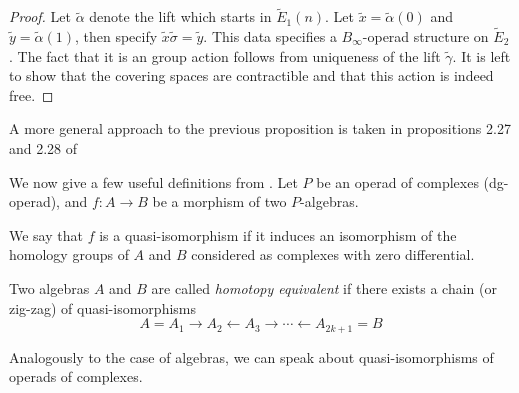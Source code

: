 \documentclass[TFM.tex]{subfiles}
\begin{document}
\begin{proof}
Let $\widetilde{\alpha}$ denote the lift which starts in $\widetilde{E}_1(n)$. Let $\widetilde{x}=\widetilde{\alpha}(0)$ and $\widetilde{y}=\widetilde{\alpha}(1)$, then specify $\widetilde{x}\widetilde{\sigma}=\widetilde{y}$. %
This data specifies a $B_\infty$-operad structure on $\widetilde{E}_2$. The fact that it is an group action follows from uniqueness of the lift $\widetilde{\gamma}$. It is left to show that the covering spaces are contractible and that this action is indeed free. %
\end{proof}

A more general approach to the previous proposition is taken in propositions 2.27 and 2.28 of \cite{tesis}

We now give a few useful definitions from \cite[]{Kontsevich}. Let $P$ be an operad of complexes (dg-operad), and $f : A→B$ be a morphism of two $P$-algebras.
\begin{defi}
We say that $f$ is a quasi-isomorphism if it induces an isomorphism of the homology
groups of $A$ and $B$ considered as complexes with zero differential.
\end{defi}

\begin{defi}
Two algebras $A$ and $B$ are called \emph{homotopy equivalent} if there exists a chain (or zig-zag) of quasi-isomorphisms
\[
A= A_1→A_2←A_3→\cdots←A_{2k+1} = B
\]
\end{defi}

Analogously to the case of algebras, we can speak about quasi-isomorphisms of operads
of complexes.
\end{document}
